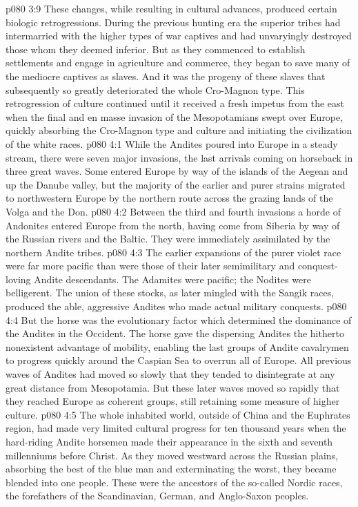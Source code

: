 \vs p080 3:9 These changes, while resulting in cultural advances, produced certain biologic retrogressions. During the previous hunting era the superior tribes had intermarried with the higher types of war captives and had unvaryingly destroyed those whom they deemed inferior. But as they commenced to establish settlements and engage in agriculture and commerce, they began to save many of the mediocre captives as slaves. And it was the progeny of these slaves that subsequently so greatly deteriorated the whole Cro\hyp{}Magnon type. This retrogression of culture continued until it received a fresh impetus from the east when the final and en masse invasion of the Mesopotamians swept over Europe, quickly absorbing the Cro\hyp{}Magnon type and culture and initiating the civilization of the white races.
\vs p080 4:1 While the Andites poured into Europe in a steady stream, there were seven major invasions, the last arrivals coming on horseback in three great waves. Some entered Europe by way of the islands of the Aegean and up the Danube valley, but the majority of the earlier and purer strains migrated to northwestern Europe by the northern route across the grazing lands of the Volga and the Don.
\vs p080 4:2 Between the third and fourth invasions a horde of Andonites entered Europe from the north, having come from Siberia by way of the Russian rivers and the Baltic. They were immediately assimilated by the northern Andite tribes.
\vs p080 4:3 The earlier expansions of the purer violet race were far more pacific than were those of their later semimilitary and conquest\hyp{}loving Andite descendants. The Adamites were pacific; the Nodites were belligerent. The union of these stocks, as later mingled with the Sangik races, produced the able, aggressive Andites who made actual military conquests.
\vs p080 4:4 \pc But the horse was the evolutionary factor which determined the dominance of the Andites in the Occident. The horse gave the dispersing Andites the hitherto nonexistent advantage of mobility, enabling the last groups of Andite cavalrymen to progress quickly around the Caspian Sea to overrun all of Europe. All previous waves of Andites had moved so slowly that they tended to disintegrate at any great distance from Mesopotamia. But these later waves moved so rapidly that they reached Europe as coherent groups, still retaining some measure of higher culture.
\vs p080 4:5 The whole inhabited world, outside of China and the Euphrates region, had made very limited cultural progress for ten thousand years when the hard\hyp{}riding Andite horsemen made their appearance in the sixth and seventh millenniums before Christ. As they moved westward across the Russian plains, absorbing the best of the blue man and exterminating the worst, they became blended into one people. These were the ancestors of the so\hyp{}called Nordic races, the forefathers of the Scandinavian, German, and Anglo\hyp{}Saxon peoples.
